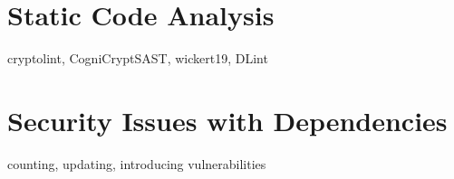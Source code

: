 
\section{Static Code Analysis}\label{sec:related-work:static-code-analysis}

cryptolint, CogniCryptSAST, wickert19, DLint \cite{egele2013, kruger2018, gong2015, smith2020, gabet2020}



\section{Security Issues with Dependencies}\label{sec:related-work:dependency-issues}

counting, updating, introducing vulnerabilities \cite{xia2014, mirhosseini2017, kula2017, watanabe2017, pashchenko2018}


